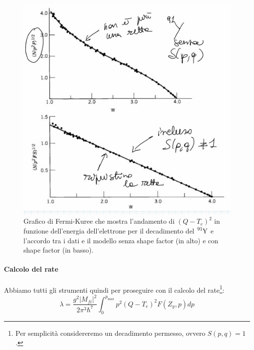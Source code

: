 \begin{figure}[h]
    \centering
    \includegraphics[scale=0.2]{Immagini/0304_andamenti4.png}
    \caption{Grafico di Fermi-Kuree che mostra l'andamento di $(Q-T_e)^2$ in funzione dell'energia dell'elettrone per il decadimento del $\ce{^{91}Y}$ e l'accordo tra i dati e il modello senza shape factor (in alto) e con shape factor (in basso).}
    \label{0304_qvalue2}
\end{figure}

\paragraph{Calcolo del rate} Abbiamo tutti gli strumenti quindi per proseguire con il calcolo del rate\footnote{Per semplicità considereremo un decadimento permesso, ovvero $S(p,q)=1$.}:
$$\lambda = \frac{g^2 |M_{fi}|^2}{2\pi^3 \hbar^7}\int_0^{p_{\max}} p^2 (Q-T_e)^2 F(Z_y,p) dp $$

